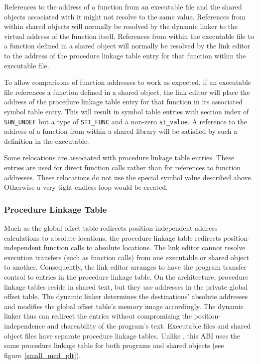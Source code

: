 References to the address of a function from an executable
file and the shared objects associated with it might not resolve to
the same value. References from within shared objects will normally be
resolved by the dynamic linker to the virtual address of the function
itself. References from within the executable file to a function
defined in a shared object will normally be resolved by the link
editor to the address of the procedure linkage table entry for that
function within the executable file.

To allow comparisons of function addresses to work as expected, if an
executable file references a function defined in a shared object, the
link editor will place the address of the procedure linkage table
entry for that function in its associated symbol table entry. This
will result in symbol table entries with section index of {\tt SHN_UNDEF}
but a type of {\tt STT_FUNC} and a non-zero {\tt st_value}.  A reference to the
address of a function from within a shared library will be satisfied
by such a definition in the executable.

Some relocations are associated with procedure linkage table
entries. These entries are used for direct function calls rather than
for references to function addresses. These relocations do not use the special
symbol value described above. Otherwise a very tight endless loop
would be created.

\subsubsection{Procedure Linkage Table}
\label{plt}



Much as the global offset table redirects position-independent address
calculations to absolute locations, the procedure linkage table
redirects position-independent function calls to absolute locations.
The link editor cannot resolve execution transfers (such as function
calls) from one executable or shared object to another.  Consequently,
the link editor arranges to have the program transfer control to
entries in the procedure linkage table.  On the \xARCH architecture,
procedure linkage tables reside in shared text, but they use addresses
in the private global offset table.  The dynamic linker determines the
destinations' absolute addresses and modifies the global offset
table's memory image accordingly.  The dynamic linker thus can
redirect the entries without compromising the position-independence
and shareability of the program's text.  Executable files and shared
object files have separate procedure linkage tables.  Unlike
\intelabi, this ABI uses the same procedure linkage table for both
programs and shared objects (see figure~\ref{small_med_plt}).

